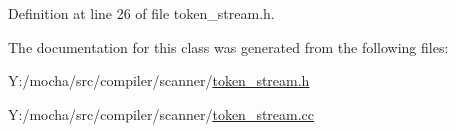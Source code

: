Definition at line 26 of file token\_\-stream.h.



The documentation for this class was generated from the following files:\begin{DoxyCompactItemize}
\item 
Y:/mocha/src/compiler/scanner/\hyperlink{token__stream_8h}{token\_\-stream.h}\item 
Y:/mocha/src/compiler/scanner/\hyperlink{token__stream_8cc}{token\_\-stream.cc}\end{DoxyCompactItemize}
